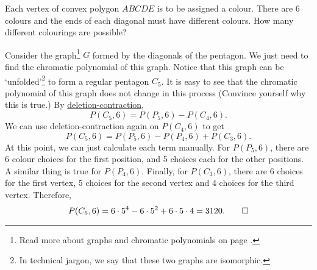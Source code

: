\begin{question}
    Each vertex of convex polygon $ABCDE$ is to be assigned a colour. There are
    6 colours and the ends of each diagonal must have different colours. How
    many different colourings are possible?
\end{question}
\begin{solution}
    Consider the graph\footnote{Read more about graphs and chromatic
    polynomials on page \pageref{teq: DC}.} $G$ formed by the diagonals of the
    pentagon. We just need to find the chromatic polynomial of this graph.
    Notice that this graph can be `unfolded'\footnote{In technical jargon, we
    say that these two graphs are isomorphic.} to form a regular pentagon
    $C_5$. It is easy to see that the chromatic polynomial of this graph does
    not change in this process (Convince yourself why this is true.) By
    \hyperref[teq: DC]{deletion-contraction},
    \[ P(C_5, 6) = P(P_5, 6) - P(C_4, 6). \]
    We can use deletion-contraction again on $P(C_4, 6)$ to get
    \[ P(C_5, 6) = P(P_5, 6) - P(P_4, 6) + P(C_3, 6). \]
    At this point, we can just calculate each term manually. For $P(P_5, 6)$,
    there are 6 colour choices for the first position, and 5 choices each for
    the other positions. A similar thing is true for $P(P_4, 6)$. Finally, for
    $P(C_3, 6)$, there are 6 choices for the first vertex, 5 choices for the
    second vertex and 4 choices for the third vertex. Therefore,
    \[ P(C_5, 6) = 6 \cdot 5^4 - 6 \cdot 5^2 + 6 \cdot 5 \cdot 4 = 3120. \qedhere \]
\end{solution}
